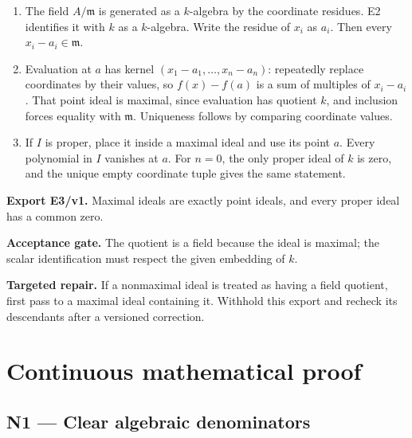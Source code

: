 \documentclass[preprint,12pt,aps,pra,showkeys,amsmath,amssymb,superscriptaddress,floatfix]{revtex4-2}
\theoremstyle{definition}
\theoremstyle{remark}
\newcommand{\field}[2]{\par\smallskip\noindent\textbf{#1.} #2\par}
\begin{document}
\begin{enumerate}[label=N3.\arabic*,leftmargin=3.4em]

\item The field \(A/\mathfrak m\) is generated as a \(k\)-algebra by the
coordinate residues. E2 identifies it with \(k\) as a \(k\)-algebra.
Write the residue of \(x_i\) as \(a_i\). Then every
\(x_i-a_i\in\mathfrak m\).

\item Evaluation at \(a\) has kernel \((x_1-a_1,\ldots,x_n-a_n)\): repeatedly
replace coordinates by their values, so \(f(x)-f(a)\) is a sum of
multiples of \(x_i-a_i\). That point ideal is maximal, since evaluation
has quotient \(k\), and inclusion forces equality with \(\mathfrak m\).
Uniqueness follows by comparing coordinate values.

\item If \(I\) is proper, place it inside a maximal ideal and use its point
\(a\). Every polynomial in \(I\) vanishes at \(a\). For \(n=0\), the
only proper ideal of \(k\) is zero, and the unique empty coordinate
tuple gives the same statement.

\end{enumerate}

\field{Export E3/v1}{Maximal ideals are exactly point ideals, and every proper ideal has a
common zero.}

\field{Acceptance gate}{The quotient is a field because the ideal is maximal; the scalar
identification must respect the given embedding of \(k\).}

\field{Targeted repair}{If a nonmaximal ideal is treated as having a field quotient, first pass
to a maximal ideal containing it. Withhold this export and recheck its
descendants after a versioned correction.}

\endgroup\clearpage\section{Continuous mathematical proof}\label{sec:proof}

\subsection{N1 --- Clear algebraic
denominators}\label{n1-clear-algebraic-denominators}
\end{document}
